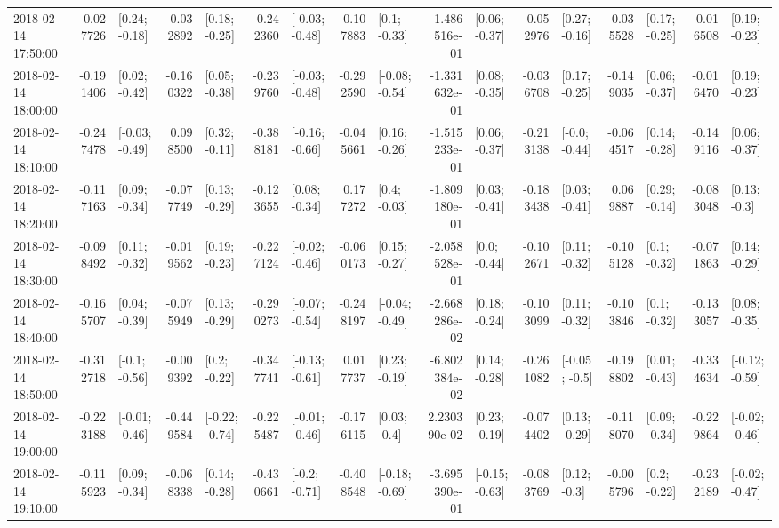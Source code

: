 \begin{tabular}{lrlrlrlrlrlrlrlrl}
2018-02-14 17:50:00 &  0.027726 &   [0.24; -0.18] & -0.032892 &   [0.18; -0.25] & -0.242360 &  [-0.03; -0.48] & -0.107883 &    [0.1; -0.33] & -1.486516e-01 &   [0.06; -0.37] &  0.052976 &   [0.27; -0.16] & -0.035528 &   [0.17; -0.25] & -0.016508 &   [0.19; -0.23] \\
2018-02-14 18:00:00 & -0.191406 &   [0.02; -0.42] & -0.160322 &   [0.05; -0.38] & -0.239760 &  [-0.03; -0.48] & -0.292590 &  [-0.08; -0.54] & -1.331632e-01 &   [0.08; -0.35] & -0.036708 &   [0.17; -0.25] & -0.149035 &   [0.06; -0.37] & -0.016470 &   [0.19; -0.23] \\
2018-02-14 18:10:00 & -0.247478 &  [-0.03; -0.49] &  0.098500 &   [0.32; -0.11] & -0.388181 &  [-0.16; -0.66] & -0.045661 &   [0.16; -0.26] & -1.515233e-01 &   [0.06; -0.37] & -0.213138 &   [-0.0; -0.44] & -0.064517 &   [0.14; -0.28] & -0.149116 &   [0.06; -0.37] \\
2018-02-14 18:20:00 & -0.117163 &   [0.09; -0.34] & -0.077749 &   [0.13; -0.29] & -0.123655 &   [0.08; -0.34] &  0.177272 &    [0.4; -0.03] & -1.809180e-01 &   [0.03; -0.41] & -0.183438 &   [0.03; -0.41] &  0.069887 &   [0.29; -0.14] & -0.083048 &    [0.13; -0.3] \\
2018-02-14 18:30:00 & -0.098492 &   [0.11; -0.32] & -0.019562 &   [0.19; -0.23] & -0.227124 &  [-0.02; -0.46] & -0.060173 &   [0.15; -0.27] & -2.058528e-01 &    [0.0; -0.44] & -0.102671 &   [0.11; -0.32] & -0.105128 &    [0.1; -0.32] & -0.071863 &   [0.14; -0.29] \\
2018-02-14 18:40:00 & -0.165707 &   [0.04; -0.39] & -0.075949 &   [0.13; -0.29] & -0.290273 &  [-0.07; -0.54] & -0.248197 &  [-0.04; -0.49] & -2.668286e-02 &   [0.18; -0.24] & -0.103099 &   [0.11; -0.32] & -0.103846 &    [0.1; -0.32] & -0.133057 &   [0.08; -0.35] \\
2018-02-14 18:50:00 & -0.312718 &   [-0.1; -0.56] & -0.009392 &    [0.2; -0.22] & -0.347741 &  [-0.13; -0.61] &  0.017737 &   [0.23; -0.19] & -6.802384e-02 &   [0.14; -0.28] & -0.261082 &   [-0.05; -0.5] & -0.198802 &   [0.01; -0.43] & -0.334634 &  [-0.12; -0.59] \\
2018-02-14 19:00:00 & -0.223188 &  [-0.01; -0.46] & -0.449584 &  [-0.22; -0.74] & -0.225487 &  [-0.01; -0.46] & -0.176115 &    [0.03; -0.4] &  2.230390e-02 &   [0.23; -0.19] & -0.074402 &   [0.13; -0.29] & -0.118070 &   [0.09; -0.34] & -0.229864 &  [-0.02; -0.46] \\
2018-02-14 19:10:00 & -0.115923 &   [0.09; -0.34] & -0.068338 &   [0.14; -0.28] & -0.430661 &   [-0.2; -0.71] & -0.408548 &  [-0.18; -0.69] & -3.695390e-01 &  [-0.15; -0.63] & -0.083769 &    [0.12; -0.3] & -0.005796 &    [0.2; -0.22] & -0.232189 &  [-0.02; -0.47] \\

\end{tabular}
